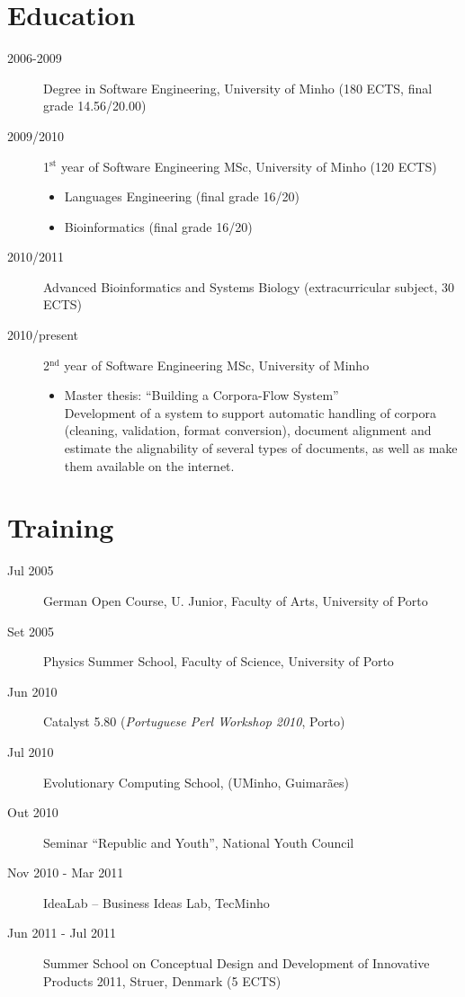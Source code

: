 \documentclass{article}
\begin{document}
\section{Education}
\begin{description}
\item [2006-2009] Degree in Software Engineering, University of Minho (180 ECTS, final grade 14.56/20.00)
\item [2009/2010] 1${^\textrm{st}}$ year of Software Engineering MSc, University of Minho (120 ECTS)
	\begin{itemize}
		\item Languages Engineering (final grade 16/20)
		\item Bioinformatics (final grade 16/20)
	\end{itemize}
\item [2010/2011] Advanced Bioinformatics and Systems Biology (extracurricular subject, 30 ECTS)
\item [2010/present] 2${^\textrm{nd}}$ year of Software Engineering MSc, University of Minho
	\begin{itemize}
		\item Master thesis: ``Building a Corpora-Flow System''\\
		Development of a system to support automatic handling of corpora (cleaning, validation, format conversion), document alignment and estimate the alignability of several types of documents, as well as make them available on the internet.
	\end{itemize}
\end{description}

\section {Training}
\begin {description}
\item [Jul 2005] German Open Course, U. Junior, Faculty of Arts, University of Porto
\item [Set 2005] Physics Summer School, Faculty of Science, University of Porto
\item [Jun 2010] Catalyst 5.80 (\textit{Portuguese Perl Workshop 2010}, Porto)
\item [Jul 2010] Evolutionary Computing School, (UMinho, Guimarães)
\item [Out 2010] Seminar ``Republic and Youth'', National Youth Council
\item [Nov 2010 - Mar 2011] IdeaLab -- Business Ideas Lab, TecMinho
\item [Jun 2011 - Jul 2011] Summer School on Conceptual Design and Development of Innovative Products 2011, Struer, Denmark (5 ECTS)
\end{description}
\end{document}
